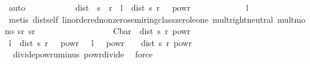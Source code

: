 \begin{isabellebody}
\ auto\isanewline
\ \ \ \ \ \ \ \ \isamarkupfalse%
\ \isamarkupfalse%
\ {\isachardoublequoteopen}dist\ {\isacharparenleft}{\kern0pt}{\isasymphi}\ s{\isacharparenright}{\kern0pt}\ {\isacharparenleft}{\kern0pt}{\isasymphi}\ r{\isacharparenright}{\kern0pt}\ {\isasymle}\ l\ {\isacharasterisk}{\kern0pt}\ {\isacharparenleft}{\kern0pt}dist\ s\ r\ {\isacharslash}{\kern0pt}\ {\isasymrho}{\isacharparenright}{\kern0pt}\ powr\ {\isasymgamma}{\isachardoublequoteclose}\isanewline
\ \ \ \ \ \ \ \ \ \ \isamarkupfalse%
\ l\isanewline
\ \ \ \ \ \ \ \ \ \ \isamarkupfalse%
\ {\isacharparenleft}{\kern0pt}metis\ dist{\isacharunderscore}{\kern0pt}self\ linordered{\isacharunderscore}{\kern0pt}nonzero{\isacharunderscore}{\kern0pt}semiring{\isacharunderscore}{\kern0pt}class{\isachardot}{\kern0pt}zero{\isacharunderscore}{\kern0pt}le{\isacharunderscore}{\kern0pt}one\ mult{\isachardot}{\kern0pt}right{\isacharunderscore}{\kern0pt}neutral\ mult{\isacharunderscore}{\kern0pt}mono\ sr{\isacharparenleft}{\kern0pt}{}{\isacharparenright}{\kern0pt}\ sr{\isacharparenleft}{\kern0pt}{}{\isacharparenright}{\kern0pt}{\isacharparenright}{\kern0pt}\isanewline
\ \ \ \ \ \ \isamarkupfalse%
\isanewline
\ \ \ \ \ \ \isamarkupfalse%
\ \isamarkupfalse%
\ {\isachardoublequoteopen}{\isachardot}{\kern0pt}{\isachardot}{\kern0pt}{\isachardot}{\kern0pt}\ {\isasymle}\ C{\isacharunderscore}{\kern0pt}bar\ {\isacharasterisk}{\kern0pt}\ dist\ s\ r\ powr\ {\isasymgamma}{\isachardoublequoteclose}\isanewline
\ \ \ \ \ \ \isamarkupfalse%
\ {\isacharminus}{\kern0pt}\isanewline
\ \ \ \ \ \ \ \ \isamarkupfalse%
\ {\isachardoublequoteopen}l\ {\isacharasterisk}{\kern0pt}\ {\isacharparenleft}{\kern0pt}dist\ s\ r\ {\isacharslash}{\kern0pt}\ {\isasymrho}{\isacharparenright}{\kern0pt}\ powr\ {\isasymgamma}\ {\isacharequal}{\kern0pt}\ l\ {\isacharasterisk}{\kern0pt}\ {\isasymrho}\ powr\ {\isacharparenleft}{\kern0pt}{\isacharminus}{\kern0pt}\ {\isasymgamma}{\isacharparenright}{\kern0pt}\ {\isacharasterisk}{\kern0pt}\ dist\ s\ r\ powr\ {\isasymgamma}\ {\isachardoublequoteclose}\isanewline
\ \ \ \ \ \ \ \ \ \ \isamarkupfalse%
\ {\isasymrho}{\isacharparenleft}{\kern0pt}{}{\isacharparenright}{\kern0pt}\ divide{\isacharunderscore}{\kern0pt}powr{\isacharunderscore}{\kern0pt}uminus\ powr{\isacharunderscore}{\kern0pt}divide\ \isamarkupfalse%
\ force\isanewline
\ \ \ \ \ \ \ \ \isamarkupfalse%
\ \isamarkupfalse%

\end{isabellebody}
